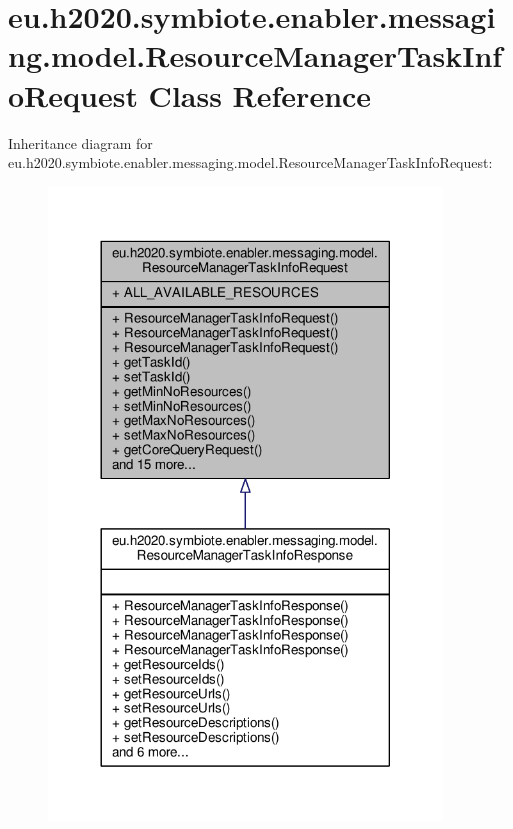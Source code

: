 \hypertarget{classeu_1_1h2020_1_1symbiote_1_1enabler_1_1messaging_1_1model_1_1ResourceManagerTaskInfoRequest}{}\section{eu.\+h2020.\+symbiote.\+enabler.\+messaging.\+model.\+Resource\+Manager\+Task\+Info\+Request Class Reference}
\label{classeu_1_1h2020_1_1symbiote_1_1enabler_1_1messaging_1_1model_1_1ResourceManagerTaskInfoRequest}


Inheritance diagram for eu.\+h2020.\+symbiote.\+enabler.\+messaging.\+model.\+Resource\+Manager\+Task\+Info\+Request\+:\nopagebreak
\begin{figure}[H]
\begin{center}
\leavevmode
\includegraphics[width=296pt]{classeu_1_1h2020_1_1symbiote_1_1enabler_1_1messaging_1_1model_1_1ResourceManagerTaskInfoRequest__inherit__graph}
\end{center}
\end{figure}


